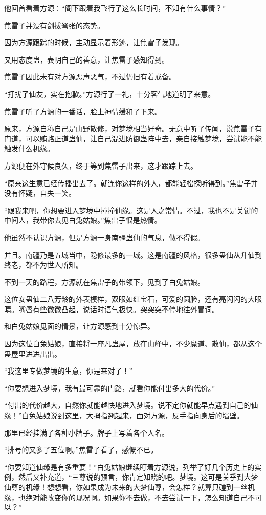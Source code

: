 \begin{this_body}
他回首看着方源：“阁下跟着我飞行了这么长时间，不知有什么事情？”

焦雷子并没有剑拔弩张的态势。

因为方源跟踪的时候，主动显示着形迹，让焦雷子发现。

又用态度蛊，表明自己的善意，让焦雷子感知得到。

焦雷子因此未有对方源恶声恶气，不过仍旧有着戒备。

“打扰了仙友，实在抱歉。”方源行了一礼，十分客气地道明了来意。

焦雷子听了方源的一番话，脸上神情缓和了下来。

原来，方源自称自己是山野散修，对梦境相当好奇。无意中听了传闻，说焦雷子有门道，可以贿赂正道蛊仙，让自己混进防御蛊阵中去，亲自接触梦境，尝试能不能触发什么机缘。

方源便在外守候良久，终于等到焦雷子出来，这才跟踪上去。

“原来这生意已经传播出去了。就连你这样的外人，都能轻松探听得到。”焦雷子并没有怀疑，自失一笑。

“跟我来吧，你想要进入梦境中撞撞仙缘。这是人之常情。不过，我也不是关键的中间人，我带你去见白兔姑娘。”焦雷子很是热情。

他虽然不认识方源，但是方源一身南疆蛊仙的气息，做不得假。

并且。南疆乃是五域当中，隐修最多的一域。这是南疆的风格，很多蛊仙从升仙到终老，都不为世人所知。

不到一天的路程，方源就在焦雷子的带领下，见到了白兔姑娘。

这位女蛊仙二八芳龄的外表模样，双眼如红宝石，可爱的圆脸，还有亮闪闪的大眼睛。嘴唇有些微微凸起，说话时语气极快。突突突不停地往外冒词。

和白兔姑娘见面的情景，让方源感到十分惊异。

因为这位白兔姑娘，直接将一座凡蛊屋，放在山峰中，不少魔道、散仙，都从这个蛊屋里进进出出。

“我这里专做梦境的生意，你是来对了！”

“你要想进入梦境，我有最可靠的门路，就看你能付出多大的代价。”

“付出的代价越大，自然你就能越快地进入梦境。说不定你就能早点遇到自己的仙缘！”白兔姑娘说到这里，大拇指翘起来，面对方源，反手指向身后的墙壁。

那里已经挂满了各种小牌子。牌子上写着各个人名。

“排号的又多了五位啊。”焦雷子看了，感慨不已。

“你要知道仙缘是有多重要！”白兔姑娘继续盯着方源说，列举了好几个历史上的实例，然后又补充道，“三尊说的预言，你肯定知晓的吧。梦境。这可是关乎到大梦仙尊的机缘！想想看，你如果成为未来的大梦仙尊，会怎样？就算只碰到一丝机缘，也绝对能改变你的现况啊。如果你不去做，不去尝试一下，怎么知道自己不可以？”


\end{this_body}
